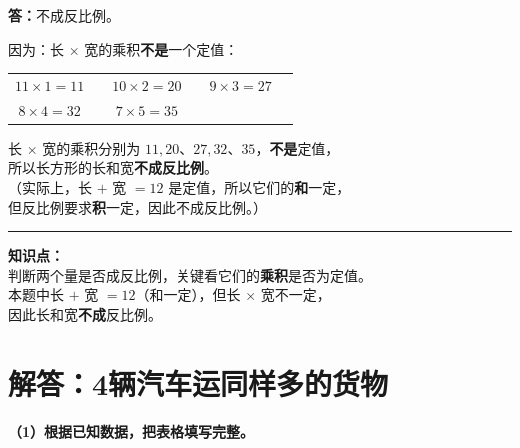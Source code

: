 \vspace{0.4cm}

\noindent
\textbf{答：}不成反比例。

\vspace{0.3cm}

\noindent
因为：长 $\times$ 宽的乘积\textbf{不是}一个定值：

\vspace{0.2cm}

\begin{center}
\renewcommand{\arraystretch}{1.6}
\begin{tabular}{cccccc}
$11 \times 1 = 11$ & \quad &
$10 \times 2 = 20$ & \quad &
$9 \times 3 = 27$ \\[4pt]
$8 \times 4 = 32$ & \quad &
$7 \times 5 = 35$ & & \\
\end{tabular}
\end{center}

\vspace{0.3cm}

\noindent
长 $\times$ 宽的乘积分别为 $11, 20$、$27, 32$、$35$，\textbf{不是}定值，\\[4pt]
所以长方形的长和宽\textbf{\textcolor{red!70!black}{不成反比例}}。\\[8pt]
（实际上，长 $+$ 宽 $= 12$ 是定值，所以它们的\textbf{和}一定，\\[2pt]
\phantom{（}但反比例要求\textbf{积}一定，因此不成反比例。）

\vspace{1cm}
\hrule
\vspace{0.4cm}

{\small\color{gray}
\textbf{知识点：}\\
判断两个量是否成反比例，关键看它们的\textbf{乘积}是否为定值。\\
本题中长 $+$ 宽 $= 12$（和一定），但长 $\times$ 宽不一定，\\
因此长和宽\textbf{不成}反比例。
}


\newpage


\section{解答：4辆汽车运同样多的货物}

\vspace{0.6cm}

\noindent\textbf{（1）根据已知数据，把表格填写完整。}


